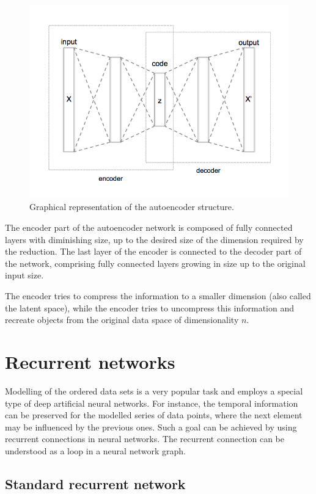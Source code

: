 \begin{figure}
  \centering
  \includegraphics[width=0.6\linewidth]{figures/chapter3/Autoencoder_structure.png}
  \caption[autoenc]{Graphical representation of the autoencoder structure\footnotemark. }
  \label{fig:autoenc}
\end{figure}


The encoder part of the autoencoder network is composed of fully connected layers with diminishing size, up to the desired size of the dimension required by the reduction.
The last layer of the encoder is connected to the decoder part of the network, comprising fully connected layers growing in size up to the original input size.

The encoder tries to compress the information to a smaller dimension (also called the latent space), while the encoder tries to uncompress this information and recreate objects from the original data space of dimensionality $n$.


\section{Recurrent networks}

Modelling of the ordered data sets is a very popular task and employs a special type of deep artificial neural networks. For instance, the temporal information can be preserved for the modelled series of data points, where the next element may be influenced by the previous ones.
Such a goal can be achieved by using recurrent connections in neural networks.
The recurrent connection can be understood as a loop in a neural network graph.

\subsection{Standard recurrent network}

